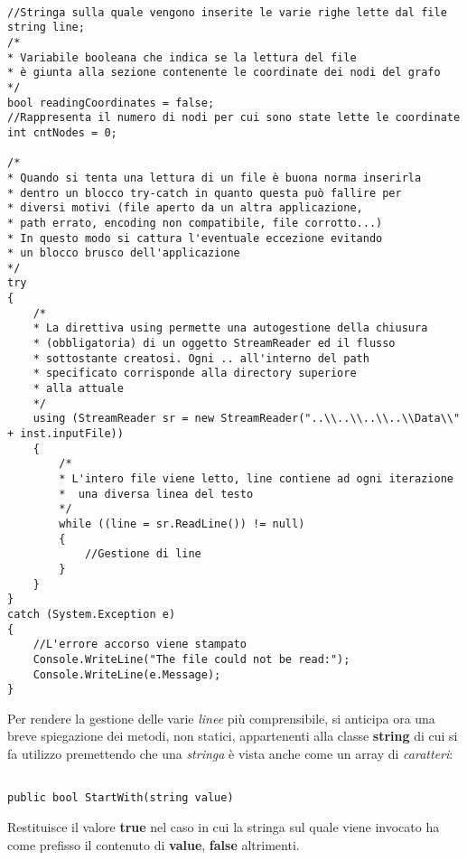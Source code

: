 \documentclass[11pt]{article}
\begin{document}
\begin{lstlisting}

//Stringa sulla quale vengono inserite le varie righe lette dal file
string line;
/*
* Variabile booleana che indica se la lettura del file
* è giunta alla sezione contenente le coordinate dei nodi del grafo
*/
bool readingCoordinates = false;
//Rappresenta il numero di nodi per cui sono state lette le coordinate
int cntNodes = 0;

/*
* Quando si tenta una lettura di un file è buona norma inserirla
* dentro un blocco try-catch in quanto questa può fallire per
* diversi motivi (file aperto da un altra applicazione,
* path errato, encoding non compatibile, file corrotto...)
* In questo modo si cattura l'eventuale eccezione evitando
* un blocco brusco dell'applicazione
*/
try
{
    /*
    * La direttiva using permette una autogestione della chiusura
    * (obbligatoria) di un oggetto StreamReader ed il flusso
    * sottostante creatosi. Ogni .. all'interno del path 
    * specificato corrisponde alla directory superiore
    * alla attuale
    */
    using (StreamReader sr = new StreamReader("..\\..\\..\\..\\Data\\" + inst.inputFile))
    {
        /*
        * L'intero file viene letto, line contiene ad ogni iterazione
        *  una diversa linea del testo
        */
        while ((line = sr.ReadLine()) != null)
        {
            //Gestione di line
        }
    }
}
catch (System.Exception e)
{
    //L'errore accorso viene stampato
    Console.WriteLine("The file could not be read:");
    Console.WriteLine(e.Message);
}

\end{lstlisting}

Per rendere la gestione delle varie \textit{linee} più comprensibile, si anticipa ora una breve spiegazione dei metodi, non statici, appartenenti alla classe \textbf{string} di cui si fa utilizzo premettendo che una \textit{stringa} è vista anche come un array di \textit{caratteri}:

\begin{lstlisting}

public bool StartWith(string value)

\end{lstlisting}

Restituisce il valore \textbf{true} nel caso in cui la stringa sul quale viene invocato ha come prefisso il contenuto di \textbf{value}, \textbf{false} altrimenti.
\end{document}
